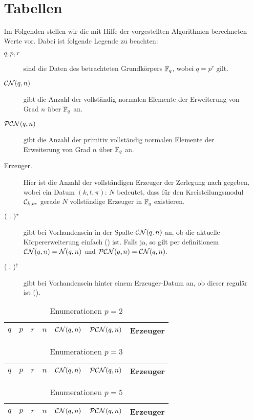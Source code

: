 \chapter{Tabellen}

Im Folgenden stellen wir die mit Hilfe der vorgestellten Algorithmen
berechneten Werte vor. Dabei ist folgende Legende zu beachten:
\begin{description}
  \item[$q, p,r$] sind die Daten des betrachteten Grundkörpers $\mathbb{F}_q$, wobei
    $q = p^r$ gilt.
  \item[$\mathcal{CN}(q,n)$] gibt die Anzahl der vollständig normalen Elemente
    der Erweiterung von Grad $n$ über $\mathbb{F}_q$ an.
  \item[$\mathcal{PCN}(q,n)$] gibt die Anzahl der primitiv vollständig normalen Elemente 
    der Erweiterung von Grad $n$ über $\mathbb{F}_q$ an.
  \item[\normalfont Erzeuger.] Hier ist die Anzahl der vollständigen Erzeuger
    der Zerlegung nach  gegeben, wobei ein Datum
    $(k,t,\pi):\, N$ bedeutet, dass für den Kreisteilungsmodul 
    $\mathcal{C}_{k,t\pi}$ gerade $N$ vollständige Erzeuger in $\mathbb{F}_q$ existieren.
  \item[$(\ .\ )^\ast$] gibt bei Vorhandensein in der Spalte $\mathcal{CN}(q,n)$ an, 
    ob die aktuelle Körpererweiterung einfach () ist.
    Falls ja, so gilt per definitionem 
    $\mathcal{CN}(q,n) = \mathcal N(q,n)$ und $\mathcal{PCN}(q,n) = \mathcal{CN}(q,n)$.
  \item[$(\ .\ )^\dagger$] gibt bei Vorhandensein hinter einem Erzeuger-Datum
    an, ob dieser regulär ist ().
\end{description}

\begin{longtable}{llllllp{7cm}}
  \caption{Enumerationen $p=2$}\\
  $q$ & $p$ & $r$ & $n$ & $\mathcal{CN}(q,n)$ & $\mathcal{PCN}(q,n)$ & Erzeuger \\\hline
  \endhead
  
\end{longtable}

\begin{longtable}{llllllp{7cm}}
  \caption{Enumerationen $p=3$}\\
  $q$ & $p$ & $r$ & $n$ & $\mathcal{CN}(q,n)$ & $\mathcal{PCN}(q,n)$ & Erzeuger \\\hline
  
\end{longtable}

\begin{longtable}{llllllp{7cm}}
  \caption{Enumerationen $p=5$}\\
  $q$ & $p$ & $r$ & $n$ & $\mathcal{CN}(q,n)$ & $\mathcal{PCN}(q,n)$ & Erzeuger \\\hline
  \endhead
  
\end{longtable}

